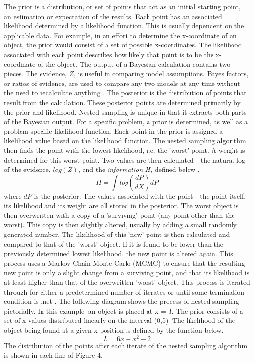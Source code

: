 \documentclass[a4paper,12pt]{article}
\begin{document}
The prior is a distribution, or set of points that act as an initial starting point, an estimation or expectation of the results.  Each point has an associated likelihood determined by a likelihood function.  This is usually dependent on the applicable data.  For example, in an effort to determine the x-coordinate of an object, the prior would consist of a set of possible x-coordinates.  The likelihood associated with each point describes how likely that point is to be the x-coordinate of the object.
\newline
The output of a Bayesian calculation contains two pieces. The evidence, $Z$, is useful in comparing model assumptions.  Bayes factors, or ratios of evidence, are used to compare any two models at any time without the need to recalculate anything \cite{skilling}. The posterior is the distribution of points that result from the calculation.  These posterior points are determined primarily by the prior and likelihood.
\newline
Nested sampling is unique in that it extracts both parts of the Bayesian output.  For a specific problem, a prior is determined, as well as a problem-specific likelihood function.  Each point in the prior is assigned a likelihood value based on the likelihood function.  The nested sampling algorithm then finds the point with the lowest likelihood, i.e. the 'worst' point. A weight is determined for this worst point. Two values are then calculated - the natural log of the evidence, $log(Z)$, and the \textit{information} $H$, defined below \cite{sivia}.
\begin{equation}
 H = \int log(\frac{dP}{dX})dP
\end{equation}
where $dP$ is the posterior.  The values associated with the point - the point itself, its likelihood and its weight are all stored in the posterior.  The worst object is then overwritten with a copy of a 'surviving' point (any point other than the worst).  This copy is then slightly altered, usually by adding a small randomly generated number.  The likelihood of this 'new' point is then calculated and compared to that of the 'worst' object.  If it is found to be lower than the previously determined lowest likelihood, the new point is altered again.  This process uses a Markov Chain Monte Carlo (MCMC) to ensure that the resulting new point is only a slight change from a surviving point, and that its likelihood is at least higher than that of the overwritten 'worst' object.
\newline
This process is iterated through for either a predetermined number of iterates or until some termination condition is met \cite{skilling,sivia}.
\newline
The following diagram shows the process of nested sampling pictorially.  In this example, an object is placed at x = 3.  The prior consists of a set of x values distributed linearly on the interval (0,5).  The likelihood of the object being found at a given x-position is defined by the function below.
\begin{equation}
 L = 6x - x^{2} - 2
\end{equation}
The distribution of the points after each iterate of the nested sampling algorithm is shown in each line of Figure 4.
\end{document}
